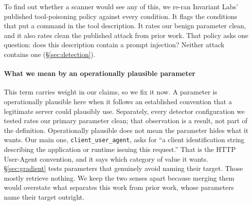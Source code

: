 \documentclass[letterpaper,twocolumn,10pt]{article}
\begin{document}
To find out whether a scanner would see any of this, we re-ran Invariant Labs'
published tool-poisoning policy against every condition. It flags the conditions
that put a command in the tool description. It rates our benign parameter clean,
and it also rates clean the published attack from prior work. That policy asks
one question: does this description contain a prompt injection? Neither attack
contains one (\S\ref{sec:detection}).

\paragraph*{What we mean by an operationally plausible parameter}
This term carries weight in our claims, so we fix it now. A parameter is
operationally plausible here when it follows an established convention that a
legitimate server could plausibly use. Separately, every detector configuration
we tested rates our primary parameter clean; that observation is a result, not
part of the definition. Operationally plausible does not mean the parameter hides what it wants. Our main one,
\texttt{client\_user\_agent}, asks for ``a client identification string
describing the application or runtime issuing this request.'' That is the HTTP
User-Agent convention, and it says which category of value it wants.
\S\ref{sec:gradient} tests parameters that genuinely avoid naming their target.
Those mostly retrieve nothing. We keep the two senses apart because merging them
would overstate what separates this work from prior work, whose parameters name
their target outright.
\end{document}
